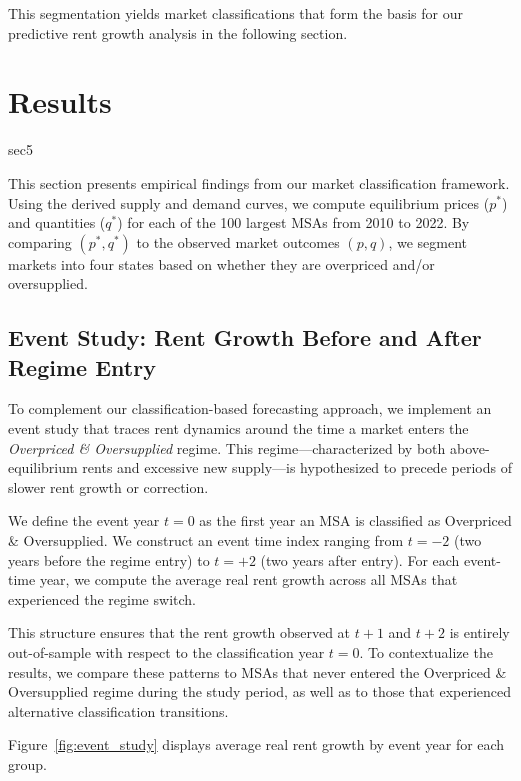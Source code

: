 \documentclass[APA,Times1COL]{WileyNJDv5} %
\begin{document}
This segmentation yields market classifications that form the basis for our predictive rent growth analysis in the following section.

\section{Results}{sec5}


This section presents empirical findings from our market classification framework. Using the derived supply and demand curves, we compute equilibrium prices (\( p^* \)) and quantities (\( q^* \)) for each of the 100 largest MSAs from 2010 to 2022. By comparing \( (p^*, q^*) \) to the observed market outcomes \( (p, q) \), we segment markets into four states based on whether they are overpriced and/or oversupplied.

\subsection{Event Study: Rent Growth Before and After Regime Entry}

To complement our classification-based forecasting approach, we implement an event study that traces rent dynamics around the time a market enters the \emph{Overpriced \& Oversupplied} regime. This regime—characterized by both above-equilibrium rents and excessive new supply—is hypothesized to precede periods of slower rent growth or correction.

We define the event year $t=0$ as the first year an MSA is classified as Overpriced \& Oversupplied. We construct an event time index ranging from $t = -2$ (two years before the regime entry) to $t = +2$ (two years after entry). For each event-time year, we compute the average real rent growth across all MSAs that experienced the regime switch.

This structure ensures that the rent growth observed at $t+1$ and $t+2$ is entirely out-of-sample with respect to the classification year $t=0$. To contextualize the results, we compare these patterns to MSAs that never entered the Overpriced \& Oversupplied regime during the study period, as well as to those that experienced alternative classification transitions.

Figure~\ref{fig:event_study} displays average real rent growth by event year for each group.
\end{document}
